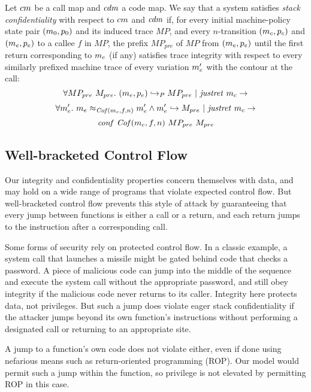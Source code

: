 \documentclass[acmsmall,review,anonymous]{acmart}\settopmatter{printfolios=true,printccs=false,printacmref=false}
\begin{document}
Let $cm$ be a call map and $\mathit{cdm}$ a code map. We say that a
system satisfies {\em stack confidentiality} with respect to
$cm$ and $\mathit{cdm}$ if, for every initial machine-policy state
pair $(m_0, p_0)$ and its induced trace $MP$, and every
$n$-transition $(m_c, p_c)$ and $(m_e, p_e)$ to a callee
$f$ in $MP$, the prefix $MP_{pre}$ of $MP$ from $(m_e, p_e)$
until the first return corresponding to $m_c$ (if any) satisfies
trace integrity with respect to every similarly prefixed machine trace
of every variation $m_e'$ with the contour at the call:
$$\forall MP_{pre} ~ M_{pre}. ~
(m_e,p_e) \hookrightarrow_P MP_{pre} ~ | ~ \mathit{justret}\ m_c \rightarrow$$
$$\forall m_e'. ~ m_e \approx_{\mathit{Cof}(m_c, f, n)} m_e' \wedge
m_e' \hookrightarrow M_{pre} ~ | ~ \mathit{justret}\ m_c \rightarrow$$
$$\mathit{conf}~\mathit{Cof}(m_c, f, n) ~ MP_{pre} ~ M_{pre}$$

\subsection{Well-bracketed Control Flow}
\label{sec:wbcf}

Our integrity and confidentiality properties concern themselves with
data, and may hold on a wide range of programs that violate expected
control flow.  But well-bracketed control flow prevents this style of
attack by guaranteeing that every jump between functions is either a
call or a return, and each return jumps to the instruction after a
corresponding call.

    Some forms of security rely on protected control flow. In a classic
    example, a system call that launches a missile might be gated behind code
    that checks a password. A piece of malicious code can jump into the middle
    of the sequence and execute the system call without the appropriate password,
    and still obey integrity if the malicious code never returns to its caller.
    Integrity here protects data, not privileges. But such a jump does violate
    eager stack confidentiality if the attacker jumps beyond its own function's
    instructions without performing a designated call or returning to an
    appropriate site.

    A jump to a function's own code does not violate either, even if done using
    nefarious means such as return-oriented programming (ROP). Our model would
    permit such a jump within the function, so privilege is not elevated by
    permitting ROP in this case.
\end{document}
